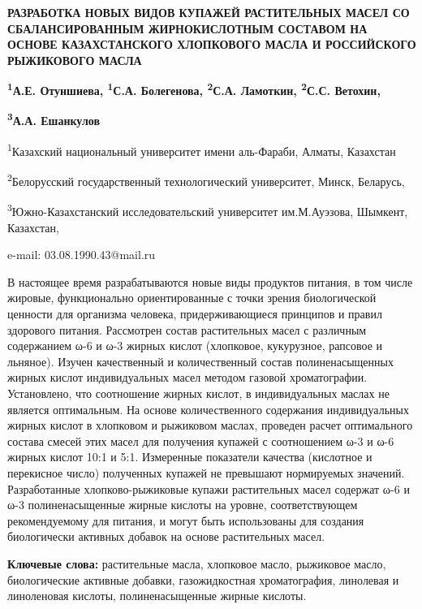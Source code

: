 \begin{center}
{\large\bfseries РАЗРАБОТКА НОВЫХ ВИДОВ КУПАЖЕЙ РАСТИТЕЛЬНЫХ МАСЕЛ СО СБАЛАНСИРОВАННЫМ ЖИРНОКИСЛОТНЫМ СОСТАВОМ НА ОСНОВЕ КАЗАХСТАНСКОГО ХЛОПКОВОГО МАСЛА И РОССИЙСКОГО РЫЖИКОВОГО МАСЛА}

{\bfseries \textsuperscript{1}А.Е. Отуншиева, \textsuperscript{1}С.А.
Болегенова, \textsuperscript{2}С.А. Ламоткин, \textsuperscript{2}С.С.
Ветохин,}

{\bfseries \textsuperscript{3}А.А. Ешанкулов}

\textsuperscript{1}Казахский национальный университет имени аль-Фараби,
Алматы, Казахстан

\textsuperscript{2}Белорусский государственный технологический
университет, Минск, Беларусь,

\textsuperscript{3}Южно-Казахстанский исследовательский университет
им.М.Ауэзова, Шымкент, Казахстан,

e-mail: 03.08.1990.43@mail.ru
\end{center}

В настоящее время разрабатываются новые виды продуктов питания, в том
числе жировые, функционально ориентированные с точки зрения
биологической ценности для организма человека, придерживающиеся
принципов и правил здорового питания. Рассмотрен состав растительных
масел с различным содержанием ω-6 и ω-3 жирных кислот (хлопковое,
кукурузное, рапсовое и льняное). Изучен качественный и количественный
состав полиненасыщенных жирных кислот индивидуальных масел методом
газовой хроматографии. Установлено, что соотношение жирных кислот, в
индивидуальных маслах не является оптимальным. На основе количественного
содержания индивидуальных жирных кислот в хлопковом и рыжиковом маслах,
проведен расчет оптимального состава смесей этих масел для получения
купажей с соотношением ω-3 и ω-6 жирных кислот 10:1 и 5:1. Измеренные
показатели качества (кислотное и перекисное число) полученных купажей не
превышают нормируемых значений. Разработанные хлопково-рыжиковые купажи
растительных масел содержат ω-6 и ω-3 полиненасыщенные жирные кислоты на
уровне, соответствующем рекомендуемому для питания, и могут быть
использованы для создания биологически активных добавок на основе
растительных масел.

{\bfseries Ключевые слова:} растительные масла, хлопковое масло, рыжиковое
масло, биологические активные добавки, газожидкостная хроматография,
линолевая и линоленовая кислоты, полиненасыщенные жирные кислоты.

